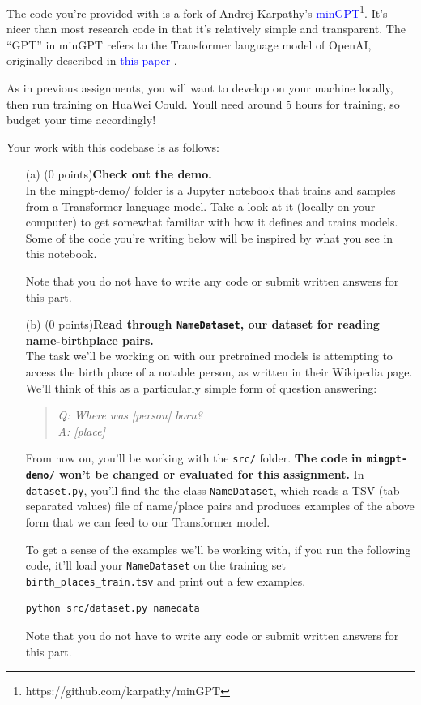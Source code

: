 \documentclass[letterpaper,12pt]{article}
\begin{document}
	\noindent The code you're provided with is a fork of Andrej Karpathy's \textcolor{blue}{minGPT\footnote{https://github.com/karpathy/minGPT}}. It's nicer than most research code in that it's relatively simple and transparent. The “GPT” in minGPT refers to the Transformer language model of OpenAI, originally described in \textcolor{blue}{this paper} \cite{b1}.
	
	\noindent As in previous assignments, you will want to develop on your machine locally, then run training on HuaWei Could. Youll need around 5 hours for training, so budget your time accordingly!

	\noindent Your work with this codebase is as follows:
	
	\begin{itemize}
	\item[(a)]
		(0 points)\textbf{Check out the demo.}\\
		In  the mingpt-demo/ folder is a Jupyter notebook that trains and samples from a Transformer language model. Take a look at it (locally on your computer) to get somewhat familiar with how it defines and trains models. Some of the code you're writing below will be inspired by what you see in this notebook.
		
		Note that you do not have to write any code or submit written answers for this part.
		
	\item[(b)]
		(0 points)\textbf{Read through \texttt{NameDataset}, our dataset for reading name-birthplace pairs.}\\
		The task we'll be working on with our pretrained models is attempting to access the birth place of a notable person, as written in their Wikipedia page.
		We'll think of this as a particularly simple form of question answering:
		\begin{quote}
			\textit{Q: Where was \textit{[person]} born?}\\
			\textit{A: [place]}
		\end{quote}
		From now on, you'll be working with the \texttt{src/} folder. \textbf{The code in \texttt{mingpt-demo/} won't be changed or evaluated for this assignment.}
		In \texttt{dataset.py}, 
		you'll find the the class \texttt{NameDataset}, which reads a TSV (tab-separated values) file of name/place pairs and produces examples of the above form that we can feed to our Transformer model.
		
		To get a sense of the examples we'll be working with, if you run the following code, it'll load your \texttt{NameDataset} on the training set \texttt{birth\_places\_train.tsv} and print out a few examples.
		\begin{lstlisting}[language=bash]
			python src/dataset.py namedata 
		\end{lstlisting}
		Note that you do not have to write any code or submit written answers for this part.
	

\end{itemize}
\end{document}
